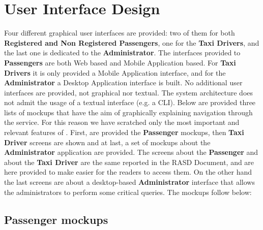 \section{User Interface Design}
Four different graphical user interfaces are provided: two of them for both \textbf{Registered and Non Registered Passengers}, one for the \textbf{Taxi Drivers}, and the last one is dedicated to the \textbf{Administrator}.
The interfaces provided to \textbf{Passengers} are both Web based and Mobile Application based.
For \textbf{Taxi Drivers} it is only provided a Mobile Application interface, and for the \textbf{Administrator} a Desktop Application interface is built.
No additional user interfaces are provided, not graphical nor textual.
The system architecture does not admit the usage of a textual interface (e.g. a CLI).
Below are provided three lists of mockups that have the aim of graphically explaining navigation through the service.
For this reason we have scratched only the most important and relevant features of \myTaxiService{}.
First, are provided the \textbf{Passenger} mockups, then \textbf{Taxi Driver} screens are shown and at last, a set of mockups about the \textbf{Administrator} application are provided.
The screens about the \textbf{Passenger} and about the \textbf{Taxi Driver} are the same reported in the RASD Document, and are here provided to make easier for the readers to access them.
On the other hand the last screens are about a desktop-based \textbf{Administrator} interface that allows the administrators to  perform some critical queries.
The mockups follow below:

\subsection{Passenger mockups}
\begin{itemize}
\end{itemize}
\newpage
